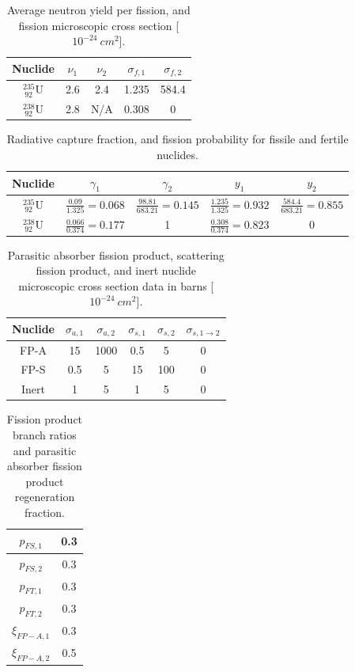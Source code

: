 %
%
\begin{table}[!hbp]
\centering
\caption{Average neutron yield per fission, and fission microscopic cross section [$10^{-24}~cm^2$]. }
\begin{tabular}{|c|c|c|c|c|}
\hline
Nuclide &	  $\nu_1$ &	$\nu_2$ & $\sigma_{f,1}$ & $\sigma_{f,2} $ \\
\hline
$^{235} _{~92} \text{U}$   & 2.6 & 2.4 & 1.235  &  584.4 \\
\hline
$^{238} _{~92} \text{U}$   & 2.8 & N/A & 0.308 &  0   \\
\hline
\end{tabular}	
\label{tbl:fission_data}
\end{table}
%
%
%
\begin{table}[!hbp]
\centering
\caption{Radiative capture fraction, and fission probability for fissile and fertile nuclides.}
\begin{tabular}{|c|c|c|c|c|}
\hline
Nuclide &	 $\gamma_1$ & $\gamma_2$ &  $y_1$ & $y_2$ \\
\hline
$^{235} _{~92} \text{U}$   & $\frac{0.09}{1.325}=0.068$ & $\frac{98.81}{683.21}=0.145$ & $\frac{1.235}{1.325}=0.932$ & $\frac{584.4}{683.21}=0.855$ \\
\hline
$^{238} _{~92} \text{U}$   &  $\frac{0.066}{0.374}=0.177 $  & 1 &  $\frac{0.308}{0.374}=0.823$ & 0 \\
\hline
\end{tabular}	
\label{tbl:fission_data_2}
\end{table}
%
%
\begin{table}[!htp]
\centering
\caption{Parasitic absorber fission product, scattering fission product, and inert nuclide microscopic cross section data in barns [$10^{-24}~cm^2$].}
\begin{tabular}{|c|c|c|c|c|c|}
\hline
Nuclide  & $\sigma_{a,1}$ & $\sigma_{a,2}$	& $\sigma_{s,1}$	& $\sigma_{s,2}$ & $\sigma_{s,1\to2} $\\
\hline
FP-A & 15  & 1000  & 0.5  & 5 & 0 \\
\hline
FP-S  & 0.5  & 5  & 15  & 100 & 0 \\
\hline
Inert & 1 & 5  & 1 & 5 & 0 \\
\hline
\end{tabular}
\label{tbl:fp-data}
\end{table}
%
%
\begin{table}[!htp]
\centering
\caption{Fission product branch ratios and parasitic absorber fission product regeneration fraction.}
\begin{tabular}{|c|c|}
\hline
$p_{FS,1} $& 0.3\\
\hline
$p_{FS,2} $& 0.3\\
\hline
$p_{FT,1} $& 0.3\\
\hline
$p_{FT,2}$ & 0.3\\
\hline
$\xi_{FP-A,1}$ & 0.3 \\
\hline
$\xi_{FP-A,2}$ & 0.5\\
\hline
\end{tabular}
\label{tbl:fp_misc}
\end{table}
\newpage
